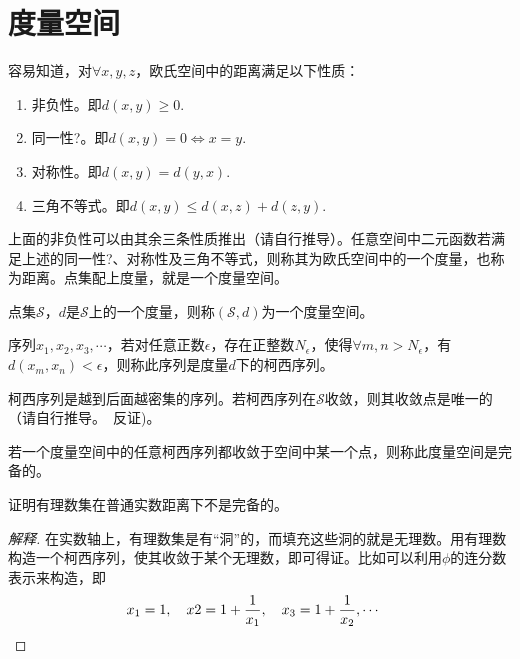 
\chapter{度量空间}
\label{chap:metric-space}

容易知道，对$\forall x,y,z$，欧氏空间中的距离满足以下性质：
\begin{enumerate}
\item 非负性。即$d(x,y)\ge0.$
\item {\color{red}同一性?}。即$d(x,y)=0\iff x=y.$
\item 对称性。即$d(x,y)=d(y,x).$
\item 三角不等式。即$d(x,y)\le d(x,z)+d(z,y).$
\end{enumerate}

上面的非负性可以由其余三条性质推出（请自行推导）。任意空间中二元函数若满足上述的{\color{red}同一性?}、对称性及三角不等式，则称其为欧氏空间中的一个度量，也称为距离。点集配上度量，就是一个度量空间。

\begin{definition}
  点集$\mathcal{S}$，$d$是$\mathcal{S}$上的一个度量，则称$(\mathcal{S},d)$为一个度量空间。
\end{definition}

\begin{definition}
  序列$x_1,x_2,x_3,\cdots$，若对任意正数$\epsilon$，存在正整数$N_\epsilon$，使得$\forall m,n>N_\epsilon$，有$d(x_m,x_n)<\epsilon$，则称此序列是度量$d$下的柯西序列。
\end{definition}

柯西序列是越到后面越密集的序列。若柯西序列在$\mathcal{S}$收敛，则其收敛点是唯一的（请自行推导。\hints　反证)。

\begin{definition}[完备性]
  若一个度量空间中的任意柯西序列都收敛于空间中某一个点，则称此度量空间是完备的。
\end{definition}

\begin{example}[有理数集]
  证明有理数集在普通实数距离下不是完备的。
\end{example}
\begin{proof}[解释]
  在实数轴上，有理数集是有“洞”的，而填充这些洞的就是无理数。用有理数构造一个柯西序列，使其收敛于某个无理数，即可得证。比如可以利用$\phi$的连分数表示来构造，即
  \begin{align*}
    x_1=1,\quad x2=1+\frac1{x_1},\quad x_3=1+\frac1{x_2},\cdots &\qedhere
  \end{align*}
\end{proof}
